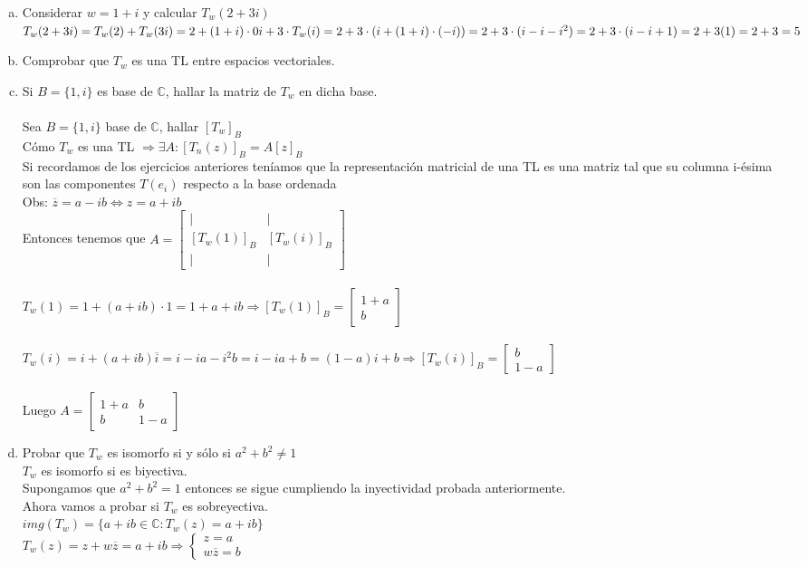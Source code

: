 \documentclass{article}
\begin{document}
\begin{enumerate}[a.]
	\item
		Considerar $w = 1+i$ y calcular $T_w(2+3i)$ \\
		$T_w(2+3i) = T_w(2)+T_w(3i) = 2+(1+i)\cdot 0i + 3\cdot T_w(i) = 2 + 3\cdot (i+(1+i)\cdot (-i)) 
		= 2+3\cdot (i -i -i^2 ) \\ = 2+3 \cdot (i-i+1) = 2+3(1)= 2+3 = 5$\\
	\item
		Comprobar que $T_w$ es una TL entre espacios vectoriales.
		\\ 
	\item
		Si $B=\{ 1,i \}$ es base de $\mathbb{C}$, hallar la matriz de $T_w$ en dicha base.
		\\ \\ Sea $B = \{ 1,i \}$ base de $\mathbb{C}$, hallar $[T_w]_B$
		\\ Cómo $T_w$ es una TL $\Rightarrow \exists A : [T_n(z)]_B = A[z]_B$
		\\ Si recordamos de los ejercicios anteriores teníamos que la representación matricial de una
		TL es una matriz tal que su columna i-ésima son las componentes $T(e_i)$ respecto a la base
		ordenada
		\\ Obs: $\overline{z} = a - ib \Leftrightarrow z = a+ib$
		\\ Entonces tenemos que 
		$A = \begin{bmatrix} |&| \\ [T_w(1)]_B&[T_w(i)]_B \\ |&| \end{bmatrix}$ \\
		\\ $T_w(1) = 1+(a+ib)\cdot 1 = 1+a+ib \Rightarrow [T_w(1)]_B = \begin{bmatrix} 1+a \\ b \end{bmatrix}$
		\\
		\\ $T_w(i) = i+(a+ib)\overline{i} = i-ia-i^2b = i-ia+b = (1-a)i +b \Rightarrow
		[T_w(i)]_B = \begin{bmatrix} b \\ 1-a \end{bmatrix}$
		\\
		\\ Luego $A = \begin{bmatrix} 1+a & b \\ b&1-a \end{bmatrix}$
	\item
		Probar que $T_w$ es isomorfo si y sólo si $a^2+b^2 \not = 1$
		\\ $T_w$ es isomorfo si es biyectiva. \\
		Supongamos que $a^2+b^2 = 1$ entonces se sigue cumpliendo la inyectividad probada
		anteriormente.
		\\ Ahora vamos a probar si $T_w$ es sobreyectiva.
		\\ $img(T_w) = \{ a+ib \in \mathbb{C} : T_w(z) = a+ib  \}$
		\\ $T_w(z) = z+w\overline{z} = a+ib \Rightarrow \begin{cases} z=a \\ w\overline{z}=b \end{cases}$


\end{enumerate}
\end{document}
